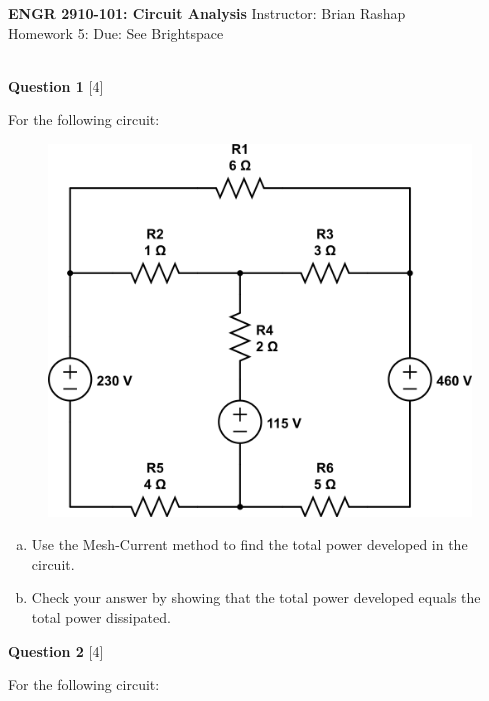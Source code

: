 \documentclass[12pt]{article}
\begin{document}
\begin{center}
\hfil
{\large\bf {ENGR 2910-101: Circuit Analysis}}
\hfill Instructor: Brian Rashap\\
Homework 5: \hfill Due: See Brightspace\\
\hrulefill\\
\end{center}

{\bf Question 1} [4] %

For the following circuit:

\begin{figure}[h!]
\begin{center}
 \includegraphics[scale=0.4]{fig4_37.png}
\end{center}
\end{figure}

\begin{enumerate}[(a)]
\item Use the Mesh-Current method to find the total power developed in the circuit.
\item Check your answer by showing that the total power developed equals the total power dissipated.
\end{enumerate}


\vspace{0.1in}

{\bf Question 2} [4] %

For the following circuit:
\end{document}

